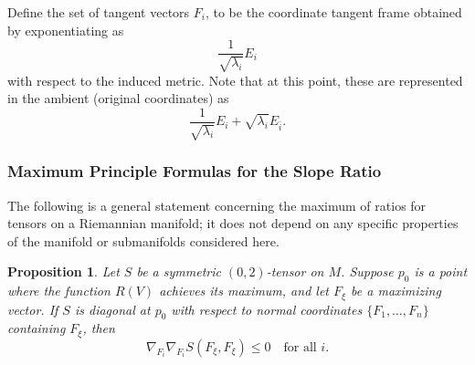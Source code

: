 \documentclass[12pt,letterpaper]{amsart}%
\newcounter{mycounter}
\numberwithin{mycounter}{section}
\theoremstyle{plain}
\newtheorem{proposition}[mycounter]{Proposition}
\numberwithin{equation}{section}
\theoremstyle{definition}
\newcommand{\maxidx}{\mathord{\xi}} %
\begin{document}
Define the set of tangent vectors $F_i$, to be the coordinate tangent frame obtained by exponentiating as
$$ \frac{1}{\sqrt{\lambda_i}} E_i$$ with respect to the induced metric. Note that at this point, these are represented in the ambient (original coordinates) as 
$$ \frac{1}{\sqrt{\lambda_i}} E_i + \sqrt{\lambda_i} E_{\bar{i}}.$$



\subsubsection{ Maximum Principle Formulas for the Slope Ratio}


The following is a general statement concerning the maximum of ratios for tensors on a Riemannian manifold; it does not depend on any specific properties of the manifold or submanifolds considered here.

\begin{proposition}
\label{p1}
Let $S$ be a symmetric $(0,2)$-tensor on $M$. 
Suppose $p_0$ is a point where the function $R(V)$ achieves its maximum, 
and let $F_{\maxidx}$ be a maximizing vector. 
If $S$ is diagonal at $p_0$ with respect to normal coordinates 
$\{F_1,\ldots,F_n\}$ containing $F_{\maxidx}$, then
\[
\nabla_{F_i}\nabla_{F_i} S(F_{\maxidx},F_{\maxidx}) \le 0
\quad \text{for all } i .
\]
\end{proposition}

\end{document}
